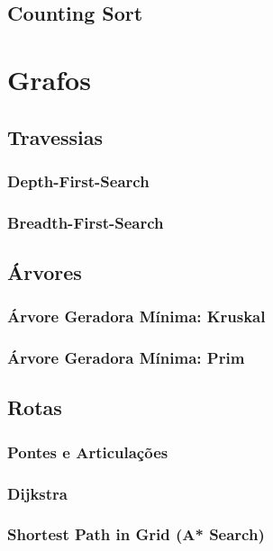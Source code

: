     \section{Counting Sort}
        
\newpage

\chapter{Grafos}
    \section{Travessias}
        \subsection{Depth-First-Search}
            
            \newpage
        \subsection{Breadth-First-Search}
            
            \newpage
    \section{Árvores}
        \subsection{Árvore Geradora Mínima: Kruskal}
            
            \newpage
        \subsection{Árvore Geradora Mínima: Prim}
            
            \newpage
    \section{Rotas}
        \subsection{Pontes e Articulações}
            
        \subsection{Dijkstra}
            
            \newpage
        \subsection{Shortest Path in Grid (A* Search)}
            
            \newpage
